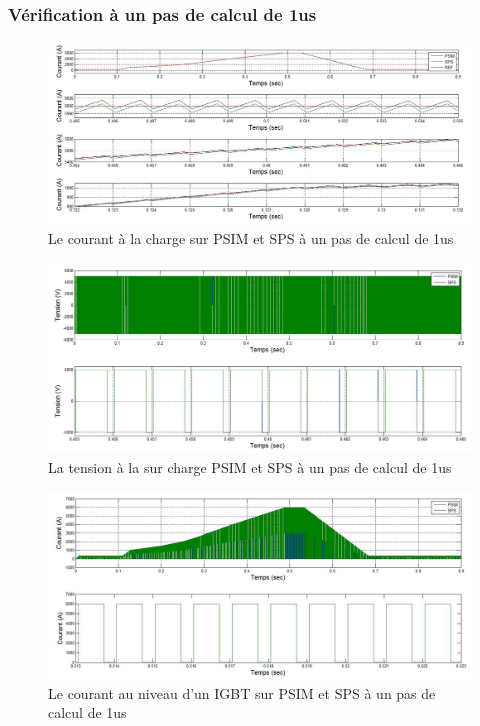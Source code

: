 \documentclass[11pt,letterpaper,final]{report}
\begin{document}
\subsubsection{Vérification à un pas de calcul de 1us}


\begin{figure}[h!]
\centering
\includegraphics[scale=0.5]{Fig/Hacheur4Quadrants/HacheurCourantCharge1u.jpg}
\caption{Le courant à la charge sur PSIM et SPS à un pas de calcul de 1us}
\label{hc_cou_ch_1}
\end{figure}


\begin{figure}[h!]
\centering
\includegraphics[scale=0.5]{Fig/Hacheur4Quadrants/HacheurTensionCharge1u.jpg}
\caption{La tension à la sur charge PSIM et SPS à un pas de calcul de 1us}
\label{hc_ten_ch_1}
\end{figure}


\begin{figure}[h!]
\centering
\includegraphics[scale=0.5]{Fig/Hacheur4Quadrants/HacheurCourantIGBT1u.jpg}
\caption{Le courant au niveau d'un IGBT sur PSIM et SPS à un pas de calcul de 1us}
\label{hc_IG_cou_1}
\end{figure}
\end{document}
